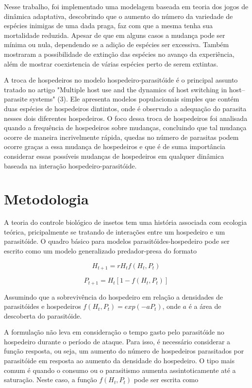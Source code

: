 Nesse trabalho, foi implementado uma modelagem baseada em teoria dos jogos de dinâmica adaptativa, descobrindo que o aumento do número da variedade de espécies inimigas de uma dada praga, faz com que a mesma tenha sua mortalidade reduzida. Apesar de que em alguns casos a mudança pode ser mínima ou nula, dependendo se a adição de espécies ser excessiva. Também mostraram a possibilidade de extinção das espécies no avanço da experiência, além de mostrar coexistencia de várias espécies perto de serem extintas. 

\medskip

A troca de hospedeiros no modelo hospedeiro-parasitóide é o principal assunto tratado no artigo "Multiple host use and the dynamics of host switching in host–parasite systems" (3). Ele apresenta  modelos populacionais simples que contém duas espécies de hospedeiros dintintos, onde é observado a adequação do parasita nesses dois diferentes hospedeiros. O foco dessa troca de hospedeiros foi analisada quando a frequência de hospedeiros sobre mudanças, concluindo que tal mudança ocorre de maneira incrivelmente rápida, quedas no número de parasitas podem ocorre graças a essa mudança de hospedeiros e que é de suma importância considerar essas possíveis mudanças de hospedeiros em qualquer dinâmica baseada na interação hospedeiro-parasitóide.

\section{Metodologia}

A teoria do controle biológico de insetos tem uma história associada
com ecologia teórica, pricipalmente se tratando de interações entre um hospedeiro e um parasitóide. O quadro básico para modelos parasitóides-hospedeiro pode ser escrito como um modelo generalizado predador-presa do formato

$$H_{t+1} = rH_t f(H_t, P_t)$$

$$P_{t+1} = H_t [1-f(H_t, P_t)]$$


Assumindo que a sobrevivência do hospedeiro em relação a
densidades de parasitóides e hospedeiros $f(H_t, P_t) = exp(-aP_t)$, onde $a$ é a área de descoberta do parasitóide.

A formulação não leva em consideração o tempo gasto pelo parasitóide no hospedeiro durante o período de ataque. Para isso, é necessário considerar a função resposta, ou seja, um aumento do número de hospedeiros parasitados por parasitóide em resposta ao aumento da densidade do hospedeiro. O tipo mais comum é quando o consumo ou o parasitismo aumenta assintoticamente até a saturação. Neste caso, a função $f(H_t,P_t)$ pode ser escrita como

